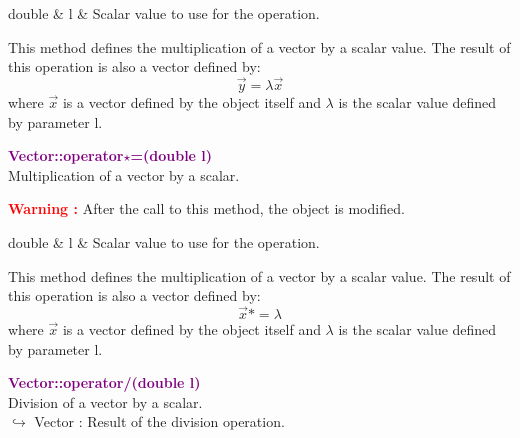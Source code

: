 \begin{tcolorbox}[width=\textwidth,myArgs,tabularx={ll|R}]
double & l & Scalar value to use for the operation.
\end{tcolorbox}

This method defines the multiplication of a vector by a scalar value.
The result of this operation is also a vector defined by:
\begin{equation*}
\overrightarrow{y} = \lambda \overrightarrow{x}
\end{equation*}
where $\overrightarrow{x}$ is a vector defined by the object itself and $\lambda$ is the scalar value defined by parameter l.

\textcolor{purple}{\textbf{Vector::operator$\star$=(double l)}}\label{Vector::operator*=(double l)}\\
Multiplication of a vector by a scalar.

\hspace*{10mm}\textcolor{red}{\textbf{Warning :}} After the call to this method, the object is modified.

\begin{tcolorbox}[width=\textwidth,myArgs,tabularx={ll|R}]
double & l & Scalar value to use for the operation.
\end{tcolorbox}

This method defines the multiplication of a vector by a scalar value.
The result of this operation is also a vector defined by:
\begin{equation*}
\overrightarrow{x} *= \lambda
\end{equation*}
where $\overrightarrow{x}$ is a vector defined by the object itself and $\lambda$ is the scalar value defined by parameter l.

\textcolor{purple}{\textbf{Vector::operator/(double l)}}\label{Vector::operator/(double l)}\\
Division of a vector by a scalar.\\ \hspace*{10mm}$\hookrightarrow$ Vector : Result of the division operation.

